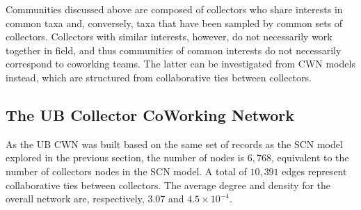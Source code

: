 


Communities discussed above are composed of collectors who share interests in common taxa and, conversely, taxa that have been sampled by common sets of collectors.
Collectors with similar interests, however, do not necessarily work together in field, and thus communities of common interests do not necessarily correspond to coworking teams.
The latter can be investigated from CWN models instead, which are structured from collaborative ties between collectors.


\subsection{The UB Collector CoWorking Network} \label{section:ub_cwn}

As the UB CWN was built based on the same set of records as the SCN model explored in the previous section, the number of nodes is $6,768$, equivalent to the number of collectors nodes in the SCN model.
A total of $10,391$ edges represent collaborative ties between collectors.
The average degree and density for the overall network are, respectively, $3.07$ and $4.5 \times 10^{-4}$.

